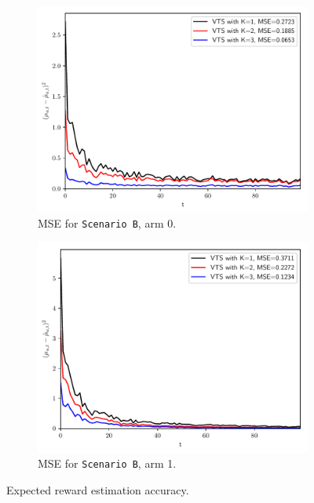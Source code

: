 \documentclass{article}
\begin{document}
\begin{figure}[!h]
	\begin{subfigure}[b]{0.49\textwidth}
		\includegraphics[width=\textwidth]{./figs/model_b_mse_arm_0.pdf}
		\caption{MSE for \texttt{Scenario B}, arm 0.}
		\label{fig:model_b_mse_arm_0}
	\end{subfigure}
	\begin{subfigure}[b]{0.49\textwidth}
		\includegraphics[width=\textwidth]{./figs/model_b_mse_arm_1.pdf}
		\caption{MSE for \texttt{Scenario B}, arm 1.}
		\label{fig:model_b_mse_arm_1}
	\end{subfigure}
	\caption{Expected reward estimation accuracy.}
	\label{fig:mse_comparison}
\end{figure}
\end{document}
